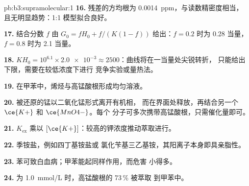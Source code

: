 \begin{solution}{pb:b3:supramolecular:1}
\textbf{16.} 残差的方均根为 \qty{0.0014}{ppm}，与读数精密度相当，
且无明显趋势：1:1 模型拟合良好。

\textbf{17.} 结合分数 $f$ 由 $G_0 = fH_0 + f/(K(1 - f))$ 给出：$f = 0.2$ 时为 0.28 当量，$f = 0.8$ 时为 2.1 当量。

\textbf{18.} $KH_0 = 10^{6.1} \times \num{2.0e-3} \approx 2500$：曲线将在一当量处尖锐转折，
只能给出下限，需要在较低浓度下进行
竞争实验或量热法。

\textbf{19.} 在甲苯中，烯烃与高锰酸根形成均匀溶液。

\textbf{20.} 被还原的锰以二氧化锰形式离开有机相，
而在界面处释放，再结合另一个 $\ce{K+}$ 和 $\ce{MnO4-}$。每个
分子可多次携带高锰酸根，只需催化量即可。

\textbf{21.} $K_{\mathrm{ex}}$ 乘以 $[\ce{K+}]$：较高的钾浓度推动萃取进行。

\textbf{22.} 季铵盐，例如四丁基铵盐或
氯化苄基三乙基铵，其阳离子本身即具亲脂性。

\textbf{23.} 苯可致白血病；甲苯能起同样作用，而危害
小得多。

\textbf{24.} 为 \qty{1.0}{mmol/L} 时，高锰酸根的 73\,\% 被萃取
到甲苯中。
\end{solution}
